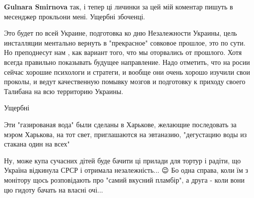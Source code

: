 \begin{itemize}
\begin{itemize}
\textbf{Gulnara Smirnova} так, і тепер ці личинки за цей мій коментар пишуть в месенджер прокльони мені. Ущербні збоченці.
\end{itemize}

 

Это будет по всей Украине, подготовка ко дню Незалежности Украины, цель
инсталляции ментально вернуть в "прекрасное" совковое прошлое, это по сути. Но
преподнесут нам , как вариант того, что мы оторвались от прошлого. Хотя всегда
правильно показывать будущее направление. Надо отметить, что на росии сейчас
хорошие психологи и стратеги, и вообще они очень хорошо изучили свои проколы, и
ведут качественную помывку мозгов и подготовку к приходу своего Талибана на всю
территорию Украины.


 
Ущербні

 

Эти "газированая вода" были сделаны в Харькове, желающие последовать за мэром
Харькова, на тот свет, приглашаются на эвтаназию, "дегустацию воды из стакана
один на всех"

 

Ну, може купа сучасних дітей буде бачити ці прилади для тортур і радіти, що
Україна відкинула СРСР і отримала незалежність... 😉 Бо одна справа, коли їм з
монітору щось розповідають про "самий вкусний пламбір", а друга - коли вони цю
гидоту бачать на власні очі...

\begin{itemize}
 

\end{itemize}
\end{itemize}
